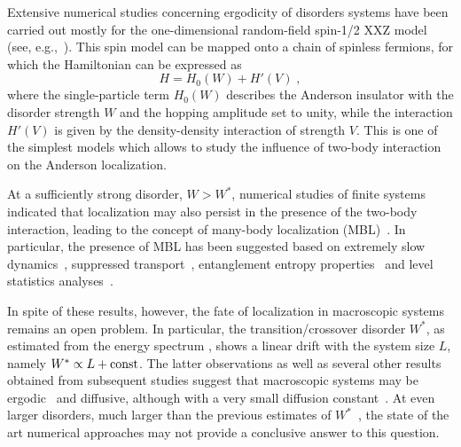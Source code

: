 \documentclass[twocolumn,pre,superscriptaddress,10pt,aps,floatfix]{revtex4-1}
\begin{document}
Extensive numerical studies concerning ergodicity of disorders systems have been carried out mostly for the one-dimensional random-field spin-1/2 XXZ model (see, e.g.,~\cite{pal10,barisic10,luitz15,luitz16,torres15,bera15,Hauschild_2016,Devakul2015,bertrand_garcia_16,Doggen2018,suntajs_bonca_20a, suntajs_2020, sierant_lewenstein_20}). 
This spin model can be mapped onto a chain of spinless fermions, for which the Hamiltonian can be expressed as
\begin{equation} \label{def_H_general}
    H = H_0(W) + H'(V) \;,
\end{equation}
where the single-particle term $H_0(W)$ describes the Anderson insulator with the disorder strength $W$ and the hopping amplitude set to unity, while the interaction $H'(V)$ is given by the density-density interaction of strength $V$.  
This is one of the simplest models which allows to study the influence of two-body interaction on the Anderson localization.

At a sufficiently strong disorder, $W>W^*$, numerical studies of finite systems indicated that localization may also persist in the presence of the two-body interaction, leading to the concept of many-body localization (MBL)~\cite{basko06,oganesyan07}. In particular, the presence of MBL has been suggested based on extremely slow dynamics~\cite{znidaric08,serbyn13_1,mierzejewski2016,luschen17,bordia2017_1,serbyn2017,Bera2019,chanda2020}, suppressed transport~\cite{berkelbach10, lev15, barisic16, steinigeweg16, bera2017, prelovsek116}, entanglement entropy properties~\cite{znidaric08,bardarson12,kjall14,baygan15, pietracaprina_parisi_17} and level statistics analyses~\cite{oganesyan07,pal10,luitz15,zakrzewski16,sierant_zakrzewski_19}.
 
In spite of these results, however, the fate of localization in macroscopic systems remains an open problem. 
In particular, the transition/crossover disorder $W^*$, as estimated from the energy spectrum \cite{suntajs_bonca_20a,suntajs_2020}, shows a linear drift with the system size $L$, namely $W^* \propto L +{\rm const}$. The latter observations as well as several other results obtained from subsequent studies suggest that macroscopic systems may be ergodic~\cite{kieferemmanouilidis_unanyan_20, sels2020, kieferemmanouilidis_unanyan_21, leblond_sels_21, vidmar2021, Sels_dilute_2021,Sels_2022,evers2023} and diffusive, although with a very small diffusion constant~\cite{barisic10}. At even larger disorders, much larger than the previous estimates of $W^*$~\cite{sierant2022,Morningstar2022}, the state of the art numerical approaches may not provide a conclusive answer to this question\cite{abanin2019,Panda2020,abanin_bardarson_21,sierant_lewenstein_20,crowley_chandran_22,bolther_kehrein_22}.
\end{document}
